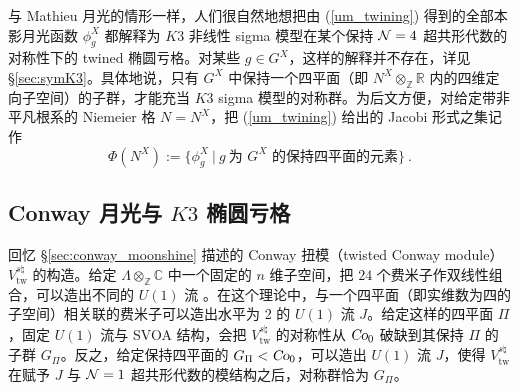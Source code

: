 \documentclass[11pt,a4paper,fontset=windows]{ctexart}
\numberwithin{equation}{section}
\newcommand{\Co}{\operatorname{\textsl{Co}}}      %
\newcommand{\CC}{\mathbb{C}}
\newcommand{\RR}{\mathbb{R}}
\newcommand{\ZZ}{\mathbb{Z}}
\newcommand{\be}{\begin{equation}}
\newcommand{\ee}{\end{equation}}
\newcommand{\eq}[1]{(\ref{#1})}
\begin{document}
与 Mathieu 月光的情形一样，人们很自然地想把由 \eq{um_twining} 得到的全部本影月光函数 $\phi_g^{X}$ 都解释为 $K3$ 非线性 sigma 模型在某个保持 ${\cal N}=4$ 超共形代数的对称性下的 twined 椭圆亏格。对某些 $g\in G^X$，这样的解释并不存在，详见 \S\ref{sec:symK3}。具体地说，只有 $G^X$ 中保持一个四平面（即 $N^X\otimes_{\ZZ} \RR$ 内的四维定向子空间）的子群，才能充当 $K3$ sigma 模型的对称群。为后文方便，对给定带非平凡根系的 Niemeier 格 $N=N^X$，把 \eq{um_twining} 给出的 Jacobi 形式之集记作
\be\label{def:umset}
\Phi(N^X):= \{\phi_g^X~\lvert~g~{\text{为 $G^X$ 的保持四平面的元素}}\}~.\ee

\subsection{Conway 月光与 $K3$ 椭圆亏格}
\label{subsec:conwayK3}

回忆 \S \ref{sec:conway_moonshine} 描述的 Conway 扭模（twisted Conway module）$V_{\text{tw}}^{s\natural}$ 的构造。给定 $\Lambda \otimes_{\ZZ} \CC$ 中一个固定的 $n$ 维子空间，把 $24$ 个费米子作双线性组合，可以造出不同的 $U(1)$ 流 \cite{Cheng:2014owa,MR3465528}。在这个理论中，与一个四平面（即实维数为四的子空间）相关联的费米子可以造出水平为 2 的 $U(1)$ 流 $J$。给定这样的四平面 $\Pi$，固定 $U(1)$ 流与 SVOA 结构，会把 $V^{s\natural}_{\text{tw}}$ 的对称性从 $\Co_0$ 破缺到其保持 $\Pi$ 的子群 $G_\Pi$。反之，给定保持四平面的 $G_\Pi< \Co_0$，可以造出 $U(1)$ 流 $J$，使得 $V^{s\natural}_{\text{tw}}$ 在赋予 $J$ 与 ${\cal N}=1$ 超共形代数的模结构之后，对称群恰为 $G_\Pi$。
\end{document}
